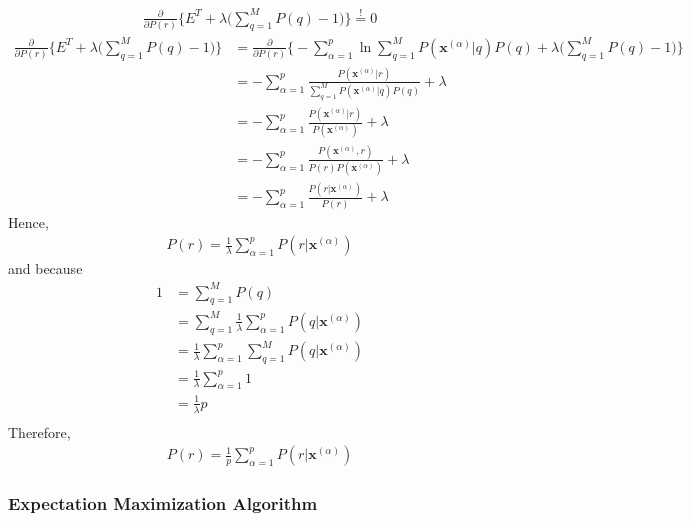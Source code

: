  \begin{align*}
 	\frac{\partial}{ \partial P(r) } \bigg \{ E^T + \lambda\bigg( \sum_{q=1}^{M} P(q) -1 \bigg)\bigg \} \stackrel{!}{=} 0
 \end{align*}
  \begin{align*}
 	\frac{\partial}{ \partial P(r) } \bigg \{ E^T + \lambda\bigg( \sum_{q=1}^{M} P(q) -1 \bigg)\bigg \} &=  	\frac{\partial}{ \partial P(r) } \bigg \{ - \sum_{\alpha=1}^{p} \ln \sum_{q=1}^{M} P(\boldsymbol{x}^{(\alpha)}|q) P(q) + \lambda\bigg( \sum_{q=1}^{M} P(q) -1 \bigg)\bigg \} \\
 	&= - \sum_{\alpha=1}^{p} \frac{P(\boldsymbol{x}^{(\alpha)}|r)}{\sum_{q=1}^{M} P(\boldsymbol{x}^{(\alpha)}|q) P(q)} + \lambda \\
 	 &= - \sum_{\alpha=1}^{p} \frac{P(\boldsymbol{x}^{(\alpha)}|r)}{ P(\boldsymbol{x}^{(\alpha)}) } + \lambda \\
 	  &= - \sum_{\alpha=1}^{p} \frac{ P(\boldsymbol{x}^{(\alpha)}, r) }{ P(r) P(\boldsymbol{x}^{(\alpha)}) } + \lambda \\
 	  &= - \sum_{\alpha=1}^{p} \frac{ P(r | \boldsymbol{x}^{(\alpha)}) }{ P(r) } + \lambda
 \end{align*}
 Hence,
 \begin{align*}
 	P(r) = \frac{1}{\lambda} \sum_{\alpha=1}^{p}  P(r | \boldsymbol{x}^{(\alpha)})
 \end{align*}
 and because 
\begin{align*}
	1 &= \sum_{q=1}^{M} P(q)  \\
	&= \sum_{q=1}^{M} \frac{1}{\lambda} \sum_{\alpha=1}^{p}  P(q | \boldsymbol{x}^{(\alpha)}) \\
	&= \frac{1}{\lambda}  \sum_{\alpha=1}^{p} \sum_{q=1}^{M}  P(q | \boldsymbol{x}^{(\alpha)}) \\	
	&= \frac{1}{\lambda}  \sum_{\alpha=1}^{p} 1 \\	
	&= \frac{1}{\lambda}  p \\	
\end{align*}
Therefore,
\begin{align*}
 	P(r) = \frac{1}{p} \sum_{\alpha=1}^{p}  P(r | \boldsymbol{x}^{(\alpha)})
\end{align*}

\subsubsection{Expectation Maximization Algorithm}

